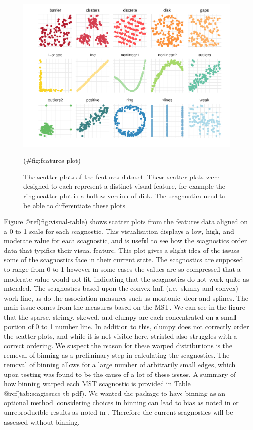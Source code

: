 \begin{Schunk}
\begin{figure}
\includegraphics[width=1\linewidth]{mason-lee-laa-cook_files/figure-latex/features-plot-1} \caption[The scatter plots of the features dataset]{The scatter plots of the features dataset. These scatter plots were designed to each represent a distinct visual feature, for example the ring scatter plot is a hollow version of disk. The scagnostics need to be able to differentiate these plots.}(\#fig:features-plot)
\end{figure}
\end{Schunk}

Figure @ref(fig:visual-table) shows scatter plots from the features data
aligned on a 0 to 1 scale for each scagnostic. This visualisation
displays a low, high, and moderate value for each scagnostic, and is
useful to see how the scagnostics order data that typifies their visual
feature. This plot gives a slight idea of the issues some of the
scagnostics face in their current state. The scagnostics are supposed to
range from 0 to 1 however in some cases the values are so compressed
that a moderate value would not fit, indicating that the scagnostics do
not work quite as intended. The scagnostics based upon the convex hull
(i.e.~skinny and convex) work fine, as do the association measures such
as montonic, dcor and splines. The main issue comes from the measures
based on the MST. We can see in the figure that the sparse, stringy,
skewed, and clumpy are each concentrated on a small portion of 0 to 1
number line. In addition to this, clumpy does not correctly order the
scatter plots, and while it is not visible here, striated also struggles
with a correct ordering. We suspect the reason for these warped
distributions is the removal of binning as a preliminary step in
calculating the scagnostics. The removal of binning allows for a large
number of arbitrarily small edges, which upon testing was found to be
the cause of a lot of these issues. A summary of how binning warped each
MST scagnostic is provided in Table @ref(tab:scagissues-tb-pdf). We
wanted the package to have binning as an optional method, considering
choices in binning can lead to bias as noted in \citet{scagdist} or
unreproducible results as noted in \citet{robust}. Therefore the current
scagnostics will be assessed without binning.

